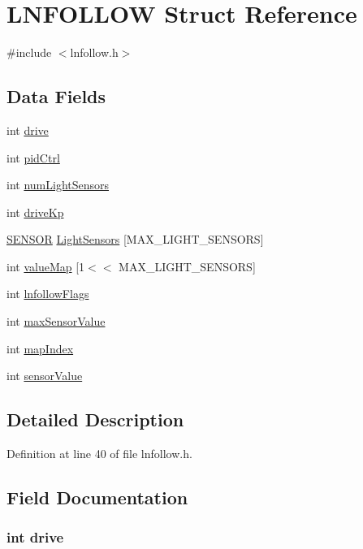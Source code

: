 \hypertarget{struct_l_n_f_o_l_l_o_w}{
\section{LNFOLLOW Struct Reference}
\label{struct_l_n_f_o_l_l_o_w}
}


{\ttfamily \#include $<$lnfollow.h$>$}

\subsection*{Data Fields}
\begin{DoxyCompactItemize}
\item 
int \hyperlink{struct_l_n_f_o_l_l_o_w_a0579263a33cc0031ef0c5b1d37743ae9}{drive}
\item 
int \hyperlink{struct_l_n_f_o_l_l_o_w_a545e56e258124a570f3243d01f73bd75}{pidCtrl}
\item 
int \hyperlink{struct_l_n_f_o_l_l_o_w_a8168f868c59bfaa91277302a4647ede1}{numLightSensors}
\item 
int \hyperlink{struct_l_n_f_o_l_l_o_w_a48762fd552af5541e8ce1c9dd65b44bd}{driveKp}
\item 
\hyperlink{struct_s_e_n_s_o_r}{SENSOR} \hyperlink{struct_l_n_f_o_l_l_o_w_a4629217ceda0d2a4e91c1ad0d6a1940f}{LightSensors} \mbox{[}MAX\_\-LIGHT\_\-SENSORS\mbox{]}
\item 
int \hyperlink{struct_l_n_f_o_l_l_o_w_a1f4934508ec19f8380f33b27397fbb53}{valueMap} \mbox{[}1$<$$<$ MAX\_\-LIGHT\_\-SENSORS\mbox{]}
\item 
int \hyperlink{struct_l_n_f_o_l_l_o_w_a16ed34094276f6e01055d4475b4a5982}{lnfollowFlags}
\item 
int \hyperlink{struct_l_n_f_o_l_l_o_w_add30ac34390161c065449682bb85d6d9}{maxSensorValue}
\item 
int \hyperlink{struct_l_n_f_o_l_l_o_w_aa168394544470246a291557687cc0abb}{mapIndex}
\item 
int \hyperlink{struct_l_n_f_o_l_l_o_w_abc6f4a0d968d01ae532d5df65e89439b}{sensorValue}
\end{DoxyCompactItemize}


\subsection{Detailed Description}


Definition at line 40 of file lnfollow.h.



\subsection{Field Documentation}
\hypertarget{struct_l_n_f_o_l_l_o_w_a0579263a33cc0031ef0c5b1d37743ae9}{
\subsubsection[{drive}]{\setlength{\rightskip}{0pt plus 5cm}int {\bf drive}}}
\label{struct_l_n_f_o_l_l_o_w_a0579263a33cc0031ef0c5b1d37743ae9}


